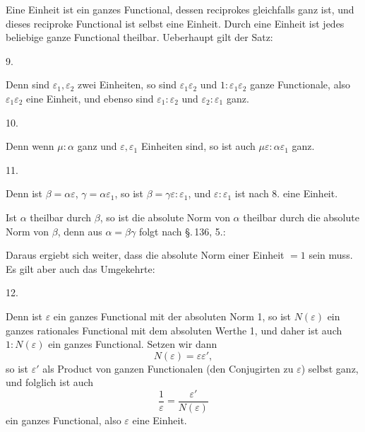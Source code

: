 
Eine Einheit ist ein ganzes Functional, dessen reciprokes gleichfalls ganz ist, und dieses reciproke Functional ist selbst eine Einheit. Durch eine Einheit ist jedes beliebige ganze Functional theilbar. Ueberhaupt gilt der Satz:

9. 

Denn sind $\varepsilon_1, \varepsilon_2$ zwei Einheiten, so sind $\varepsilon_1\varepsilon_2$ und $1:\varepsilon_1\varepsilon_2$ ganze Functionale, also $\varepsilon_1\varepsilon_2$ eine Einheit, und ebenso sind $\varepsilon_1:\varepsilon_2$ und $\varepsilon_2:\varepsilon_1$ ganz.

10. 

Denn wenn $\mu:\alpha$ ganz und $\varepsilon, \varepsilon_1$ Einheiten sind, so ist auch $\mu\varepsilon:\alpha\varepsilon_1$ ganz.

11. 

Denn ist $\beta=\alpha\varepsilon$, $\gamma=\alpha\varepsilon_1$, so ist $\beta=\gamma\varepsilon:\varepsilon_1$, und $\varepsilon:\varepsilon_1$ ist nach 8. eine Einheit.

Ist $\alpha$ theilbar durch $\beta$, so ist die absolute Norm von $\alpha$ theilbar durch die absolute Norm von $\beta$, denn aus $\alpha=\beta\gamma$ folgt nach \S.\,136, 5.:


Daraus ergiebt sich weiter, dass die absolute Norm einer Einheit $=1$ sein muss. Es gilt aber auch das Umgekehrte:

12. 

Denn ist $\varepsilon$ ein ganzes Functional mit der absoluten Norm 1, so ist $N(\varepsilon)$ ein ganzes rationales Functional mit dem absoluten Werthe 1, und daher ist auch $1:N(\varepsilon)$ ein ganzes Functional. Setzen wir dann
\[
N(\varepsilon) = \varepsilon\varepsilon',
\]
so ist $\varepsilon'$ als Product von ganzen Functionalen (den Conjugirten zu $\varepsilon$) selbst ganz, und folglich ist auch
\[
\frac{1}{\varepsilon} = \frac{\varepsilon'}{N(\varepsilon)}
\]
ein ganzes Functional, also $\varepsilon$ eine Einheit.
